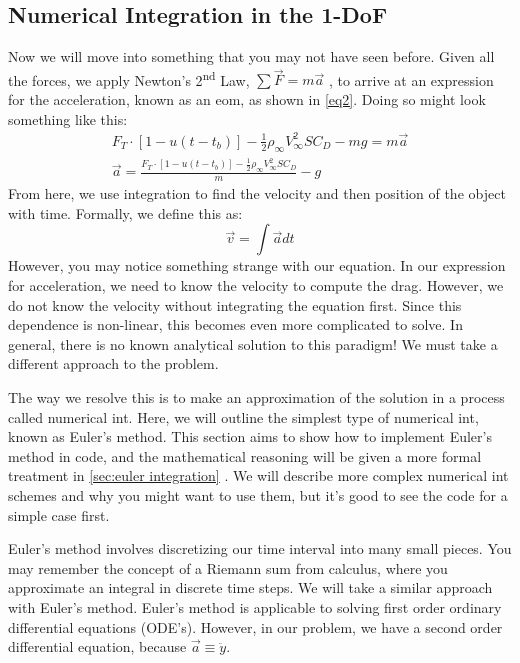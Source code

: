 \documentclass[10pt, openany, titlepage]{book}
\theoremstyle{definition}
\let\oldautoref\autoref
\renewcommand{\autoref}[1]{%
  \begingroup
  \hypersetup{linkcolor=black}%
  \oldautoref{#1}%
  \endgroup
}
\begin{document}
\subsection{Numerical Integration in the 1-DoF}\label{sec: Numerical Integration in the 1DoF}

Now we will move into something that you may not have seen before. Given all the forces, we apply Newton’s 2\textsuperscript{nd} Law, $\sum{\vec{F}}=m\vec{a}$ , to arrive at an expression for the acceleration, known as an \gls{eom}, as shown in \eqref{eq2}. Doing so might look something like this:
\begin{gather}
F_T \cdot [1-u(t-t_b)]-\frac{1}{2}\rho_{\infty}V_{\infty}^2SC_D-mg=m\vec{a}\label{eq1} \\
\vec{a}=\frac{F_T \cdot [1-u(t-t_b)]-\frac{1}{2}\rho_{\infty}V_{\infty}^2SC_D}{m}-g\label{eq2}
\end{gather}
 From here, we use integration to find the velocity and then position of the object with time. Formally, we define this as:
 $$\vec{v}=\int{\vec{a}}{dt}$$
However, you may notice something strange with our equation. In our expression for acceleration, we need to know the velocity to compute the drag. However, we do not know the velocity without integrating the equation first. Since this dependence is non-linear, this becomes even more complicated to solve. In general, there is no known analytical solution to this paradigm! We must take a different approach to the problem. 


The way we resolve this is to make an approximation of the solution in a process called \gls{numerical int}. Here, we will outline the simplest type of \gls{numerical int}, known as Euler’s method. This section aims to show how to implement Euler’s method in code, and the mathematical reasoning will be given a more formal treatment in \autoref{sec:euler integration}. We will describe more complex \gls{numerical int} schemes and why you might want to use them, but it’s good to see the code for a simple case first.

Euler’s method involves discretizing our time interval into many small pieces. You may remember the concept of a Riemann sum from calculus, where you approximate an integral in discrete time steps. We will take a similar approach with Euler’s method. Euler’s method is applicable to solving first order ordinary differential equations (ODE’s). However, in our problem, we have a second order differential equation, because $\vec{a}\equiv\ddot{y}$.
\end{document}
